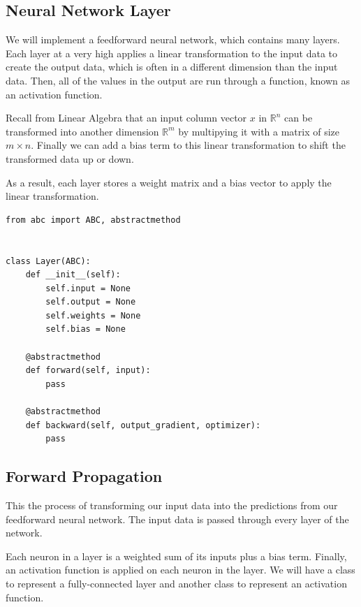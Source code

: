 \documentclass[openany]{book}
\begin{document}
    \subsection{Neural Network Layer}\label{neural-network-layer}

We will implement a feedforward neural network, which contains many
layers. Each layer at a very high applies a linear transformation to the
input data to create the output data, which is often in a different
dimension than the input data. Then, all of the values in the output are
run through a function, known as an activation function.

Recall from Linear Algebra that an input column vector \(x\) in
\(\mathbb{R}^n\) can be transformed into another dimension
\(\mathbb{R}^m\) by multipying it with a matrix of size \(m \times n\).
Finally we can add a bias term to this linear transformation to shift
the transformed data up or down.

As a result, each layer stores a weight matrix and a bias vector to
apply the linear transformation.

\begin{tcolorbox}
\tiny
\begin{verbatim}
from abc import ABC, abstractmethod


class Layer(ABC):
    def __init__(self):
        self.input = None
        self.output = None
        self.weights = None
        self.bias = None

    @abstractmethod
    def forward(self, input):
        pass

    @abstractmethod
    def backward(self, output_gradient, optimizer):
        pass
\end{verbatim}
\end{tcolorbox}

    \subsection{Forward Propagation}\label{forward-propagation}

This the process of transforming our input data into the predictions
from our feedforward neural network. The input data is passed through
every layer of the network. 

    Each neuron in a layer is a weighted sum of its inputs plus a bias term.
Finally, an activation function is applied on each neuron in the layer.
We will have a class to represent a fully-connected layer and another
class to represent an activation function.
\end{document}

